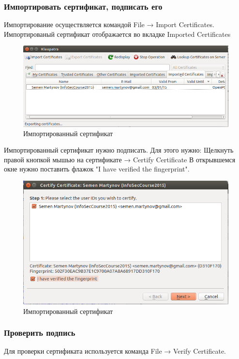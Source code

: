 \documentclass[12pt,a4paper]{article}
\begin{document}
\subsubsection{Импортировать сертификат, подписать его}
Импортирование осуществляется командой File → Import Certificates. Импортированый сертификат отображается во вкладке Imported Certificates
\begin{figure}[h!]
\centering
\includegraphics[scale=0.6]{resources/is.png}
\caption{Импортированный сертификат}
\end{figure}
Импортированный сертификат нужно подписать. Для этого нужно: Щелкнуть правой кнопкой мышью на сертификате  →  Certify Certificate
В открывшемся окне нужно поставить флажок "I have verified the fingerprint".
\begin{figure}[h!]
\centering
\includegraphics[scale=0.6]{resources/ss.png}
\caption{Импортированный сертификат}
\end{figure}
\subsubsection{Проверить подпись}
Для проверки сертификата используется команда File → Verify Certificate.
\end{document}
